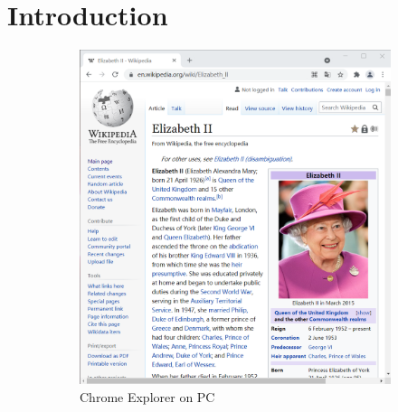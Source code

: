 \section{Introduction}

\begin{figure}[t]
\centering
\begin{subfigure}{0.5\textwidth}
  \centering
  \includegraphics[width=1\textwidth]{intropage_pc}
  \caption{Chrome Explorer on PC}
  \label{intropage_pc}
\end{subfigure}%
\hspace{0.5in}
\begin{subfigure}{0.25\textwidth}
  \centering

\end{subfigure}
\end{figure}
